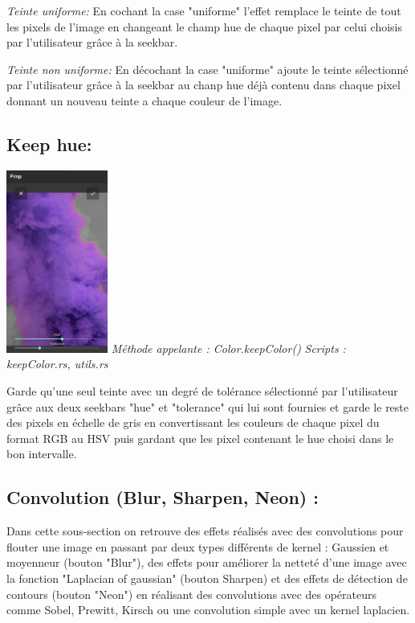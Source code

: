     \emph{Teinte uniforme:}
        En cochant la case "uniforme" l'effet remplace le teinte de tout les pixels de l'image en changeant le champ hue de chaque pixel par celui choisis par l'utilisateur grâce à la seekbar.
        

    \emph{Teinte non uniforme:}
        En décochant la case "uniforme" ajoute le teinte sélectionné par l'utilisateur grâce à la seekbar au chanp hue déjà contenu dans chaque pixel donnant un nouveau 
        teinte a chaque couleur de l'image.
        


\subsection{Keep hue:}

\includegraphics[width=0.25\textwidth]{report_src/effects/keepColor.png}
\newline
\emph{Méthode appelante : Color.keepColor()}
\emph{Scripts : keepColor.rs, utils.rs} 
\newline

Garde qu'une seul teinte avec un degré de tolérance sélectionné par l'utilisateur grâce aux deux seekbars "hue"  et "tolerance" qui lui sont fournies et garde 
le reste des pixels en échelle de gris en convertissant les couleurs de chaque pixel du format RGB au HSV puis gardant que les pixel contenant le hue choisi dans le bon intervalle.
\\

\subsection{Convolution (Blur, Sharpen, Neon) :} \label{convolution}

    Dans cette sous-section on retrouve des effets réalisés avec des convolutions pour flouter une image en passant par deux types différents de kernel : Gaussien et moyenneur
    (bouton "Blur"), des effets pour améliorer la netteté d'une image avec la fonction "Laplacian of gaussian" (bouton Sharpen) et des effets de 
    détection de contours (bouton "Neon") en réalisant des convolutions avec des opérateurs comme Sobel, Prewitt, Kirsch ou une convolution simple avec un kernel
    laplacien.
    \\

